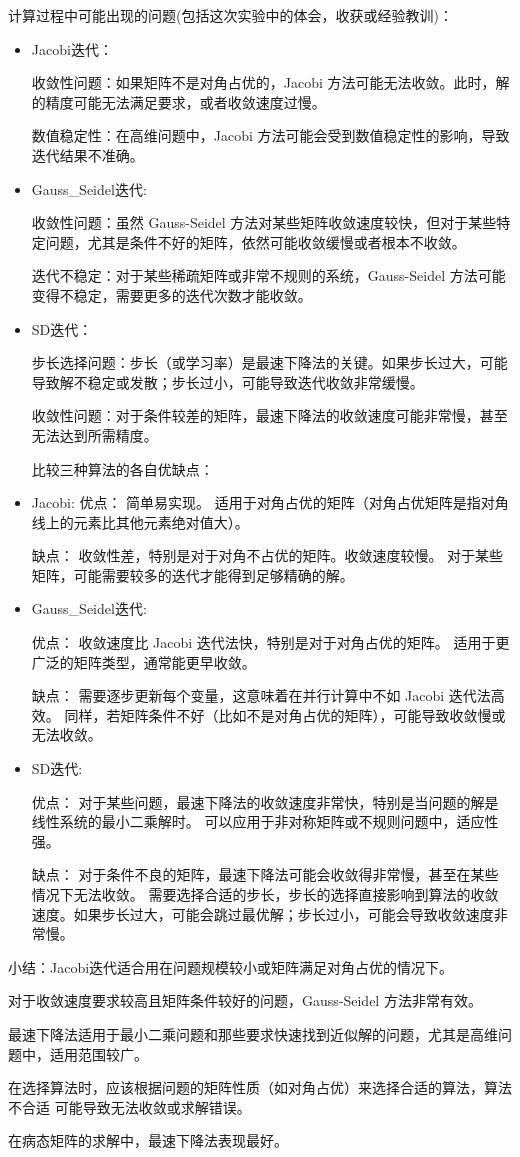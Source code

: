 \documentclass[12pt]{article}
\begin{document}
 {计算过程中可能出现的问题(包括这次实验中的体会，收获或经验教训)}：
\begin{itemize}
\item  {\color{blue}Jacobi迭代：}

收敛性问题：如果矩阵不是对角占优的，Jacobi 方法可能无法收敛。此时，解的精度可能无法满足要求，或者收敛速度过慢。


数值稳定性：在高维问题中，Jacobi 方法可能会受到数值稳定性的影响，导致迭代结果不准确。
\item {\color{blue}Gauss\_Seidel迭代:} 

收敛性问题：虽然 Gauss-Seidel 方法对某些矩阵收敛速度较快，但对于某些特定问题，尤其是条件不好的矩阵，依然可能收敛缓慢或者根本不收敛。

迭代不稳定：对于某些稀疏矩阵或非常不规则的系统，Gauss-Seidel 方法可能变得不稳定，需要更多的迭代次数才能收敛。

\item {\color{blue}SD迭代：}

步长选择问题：步长（或学习率）是最速下降法的关键。如果步长过大，可能导致解不稳定或发散；步长过小，可能导致迭代收敛非常缓慢。

收敛性问题：对于条件较差的矩阵，最速下降法的收敛速度可能非常慢，甚至无法达到所需精度。
\hfill %

{比较三种算法的各自优缺点}：
\item  {\color{blue}Jacobi:}
优点：
简单易实现。
适用于对角占优的矩阵（对角占优矩阵是指对角线上的元素比其他元素绝对值大）。

缺点：
收敛性差，特别是对于对角不占优的矩阵。收敛速度较慢。
对于某些矩阵，可能需要较多的迭代才能得到足够精确的解。
\item {\color{blue} Gauss\_Seidel迭代:}

优点：
收敛速度比 Jacobi 迭代法快，特别是对于对角占优的矩阵。
适用于更广泛的矩阵类型，通常能更早收敛。

缺点：
需要逐步更新每个变量，这意味着在并行计算中不如 Jacobi 迭代法高效。
同样，若矩阵条件不好（比如不是对角占优的矩阵），可能导致收敛慢或无法收敛。

\item {\color{blue}SD迭代:}

优点：
对于某些问题，最速下降法的收敛速度非常快，特别是当问题的解是线性系统的最小二乘解时。
可以应用于非对称矩阵或不规则问题中，适应性强。

缺点：
对于条件不良的矩阵，最速下降法可能会收敛得非常慢，甚至在某些情况下无法收敛。
需要选择合适的步长，步长的选择直接影响到算法的收敛速度。如果步长过大，可能会跳过最优解；步长过小，可能会导致收敛速度非常慢。

\end{itemize}
{\color{blue}小结：}Jacobi迭代适合用在问题规模较小或矩阵满足对角占优的情况下。

对于收敛速度要求较高且矩阵条件较好的问题，Gauss-Seidel 方法非常有效。

最速下降法适用于最小二乘问题和那些要求快速找到近似解的问题，尤其是高维问题中，适用范围较广。

在选择算法时，应该根据问题的矩阵性质（如对角占优）来选择合适的算法，算法不合适
可能导致无法收敛或求解错误。

在病态矩阵的求解中，最速下降法表现最好。
\end{document}

